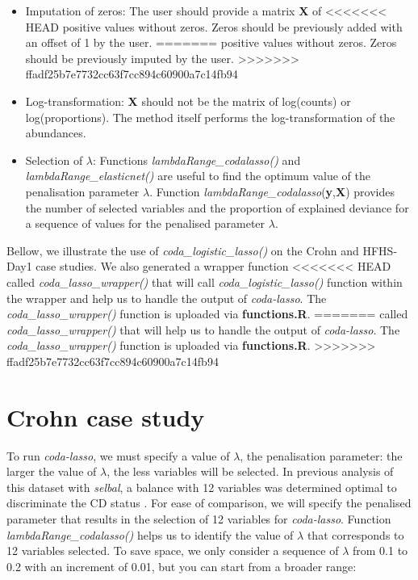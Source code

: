 \documentclass[openany]{book}
\providecommand{\tightlist}{%
  \setlength{\itemsep}{0pt}\setlength{\parskip}{0pt}}
\begin{document}
\begin{itemize}
\tightlist
\item
  Imputation of zeros: The user should provide a matrix \textbf{X} of
<<<<<<< HEAD
  positive values without zeros. Zeros should be previously added with
  an offset of 1 by the user.
=======
  positive values without zeros. Zeros should be previously imputed by
  the user.
>>>>>>> ffadf25b7e7732cc63f7cc894c60900a7c14fb94
\item
  Log-transformation: \textbf{X} should not be the matrix of log(counts)
  or log(proportions). The method itself performs the log-transformation
  of the abundances.
\item
  Selection of \(\lambda\): Functions \emph{lambdaRange\_codalasso()}
  and \emph{lambdaRange\_elasticnet()} are useful to find the optimum
  value of the penalisation parameter \(\lambda\). Function
  \emph{lambdaRange\_codalasso}(\textbf{y},\textbf{X}) provides the
  number of selected variables and the proportion of explained deviance
  for a sequence of values for the penalised parameter \(\lambda\).
\end{itemize}

Bellow, we illustrate the use of \emph{coda\_logistic\_lasso()} on the
Crohn and HFHS-Day1 case studies. We also generated a wrapper function
<<<<<<< HEAD
called \emph{coda\_lasso\_wrapper()} that will call
\emph{coda\_logistic\_lasso()} function within the wrapper and help us
to handle the output of \emph{coda-lasso}. The
\emph{coda\_lasso\_wrapper()} function is uploaded via
\textbf{functions.R}.
=======
called \emph{coda\_lasso\_wrapper()} that will help us to handle the
output of \emph{coda-lasso}. The \emph{coda\_lasso\_wrapper()} function
is uploaded via \textbf{functions.R}.
>>>>>>> ffadf25b7e7732cc63f7cc894c60900a7c14fb94

\section{Crohn case study}\label{crohn-case-study-2}

To run \emph{coda-lasso}, we must specify a value of \(\lambda\), the
penalisation parameter: the larger the value of \(\lambda\), the less
variables will be selected. In previous analysis of this dataset with
\emph{selbal}, a balance with 12 variables was determined optimal to
discriminate the CD status \citep{rivera2018balances}. For ease of
comparison, we will specify the penalised parameter that results in the
selection of 12 variables for \emph{coda-lasso}. Function
\emph{lambdaRange\_codalasso()} helps us to identify the value of
\(\lambda\) that corresponds to 12 variables selected. To save space, we
only consider a sequence of \(\lambda\) from 0.1 to 0.2 with an
increment of 0.01, but you can start from a broader range:
\end{document}
